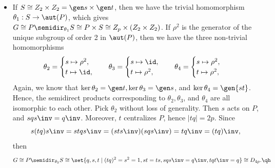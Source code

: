 \begin{sol}
\begin{itemize}
        If $p \equiv 1 \bmod 4$, then $p - 1 \equiv 0 \bmod 4$, hence $\phi(s)$ can be sent to $\id$ or one of the two elements of order 4 in $\aut(P)$ (which are isomorphic since their images generate the same subgroup), or the unique element of order 2 in $\aut(P)$. If $\aut(P) = \gen\alpha$, let $\rho = \alpha^{(p - 1)/4}$, which has order 4. Then we have the three non-trivial homomorphisms
        \[\phi_1 : s \mapsto \rho, \quad \phi_2 : s \mapsto \rho^3, \quad \phi_3 : s \mapsto \rho^2.\]
        We know that $\phi_1$ and $\phi_2$ give isomorphic semidirect products, since $\phi_1(S) = \phi_2(S) = \gen\rho$. Hence, we have two non-abelian groups of order $4p$, and we have
        \[G \cong P \semidir_{\phi_1} S \cong \set{q, s \mid q^p = s^4 = 1, sqs\inv = q^k}.\]
        for some $k \in \units[p]$ such that $|k| = 4$. In the case of $\phi_3$, we have $sqs\inv = q\inv$. Then
        \[G \cong P \semidir_{\phi_3} S \cong \set{q, s \mid q^p = s^4 = 1, sqs\inv = q\inv}.\]
        \item If $S \cong Z_2 \times Z_2 = \gen s \times \gen t$, then we have the trivial homomorphism $\theta_1 : S \to \aut(P)$, which gives $G \cong P \semidir_{\theta_1} S \cong P \times S \cong Z_p \times (Z_2 \times Z_2)$. If $\rho^2$ is the generator of the unique subgroup of order 2 in $\aut(P)$, then we have the three non-trivial homomorphisms
        \[\theta_2 = 
        \begin{cases}
            s \mapsto \rho^2, \\
            t \mapsto \id,
        \end{cases} \quad
        \theta_3 =
        \begin{cases}
            s \mapsto \id, \\
            t \mapsto \rho^2,
        \end{cases} \quad
        \theta_4 =
        \begin{cases}
            s \mapsto \rho^2, \\
            t \mapsto \rho^2,
        \end{cases}\]
        Again, we know that $\ker\theta_2 = \gen t, \ker\theta_3 = \gen s$, and $\ker\theta_4 = \gen{st}$. Hence, the semidirect products corresponding to $\theta_2, \theta_3$, and $\theta_4$ are all isomorphic to each other. Pick $\theta_2$ without loss of generality. Then $s$ acts on $P$, and $sqs\inv = q\inv$. Moreover, $t$ centralizes $P$, hence $|tq| = 2p$. Since
        \[s(tq)s\inv = stqs\inv = (sts\inv)(sqs\inv) = tq\inv = (tq)\inv,\]
        then
        \[G \cong P \semidir_{\theta_2} S \cong \set{q, s, t \mid (tq)^2 = s^2 = 1, st = ts, sqs\inv = q\inv, tqt\inv = q} \cong D_{4p}. \qh\]
    \end{itemize}
\end{sol}

